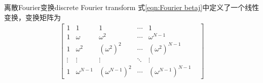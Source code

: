 \begin{definition}
    {离散Fourier变换}{discrete Fourier transform}
    式\eqref{eqn:Fourier betaj}中定义了一个线性变换，变换矩阵为
    \begin{eqnarray}
        \begin{bmatrix}
            1&1&1&\cdots&1\\
            1&\omega&\omega^2&\cdots&\omega^{N-1}\\
            1&\omega^2&(\omega^2)^2&\cdots&(\omega^2)^{N-1}\\
            \vdots&\vdots&\vdots&\ddots&\vdots&\\
            1&\omega^{N-1}&(\omega^{N-1})^2&\cdots&(\omega^{N-1})^{N-1}
        \end{bmatrix}
    \end{eqnarray}
\end{definition}



